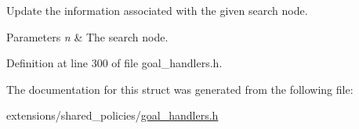 Update the information associated with the given search node. 


\begin{DoxyParams}{Parameters}
{\em n} & The search node. \\
\hline
\end{DoxyParams}


Definition at line 300 of file goal\+\_\+handlers.\+h.



The documentation for this struct was generated from the following file\+:\begin{DoxyCompactItemize}
\item 
extensions/shared\+\_\+policies/\hyperlink{goal__handlers_8h}{goal\+\_\+handlers.\+h}\end{DoxyCompactItemize}
